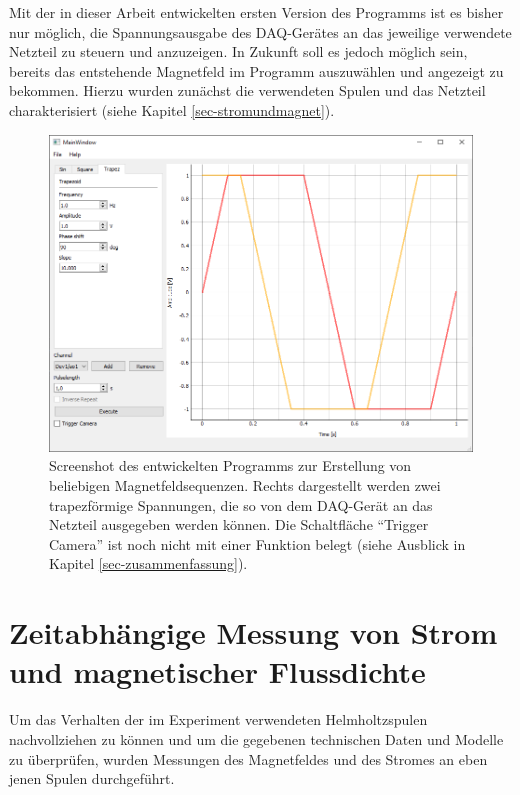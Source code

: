\documentclass[page,pdftex,12pt,a4paper,twoside,openright]{scrbook}
\begin{document}
Mit der in dieser Arbeit entwickelten ersten Version des Programms ist es bisher nur möglich, die Spannungsausgabe des DAQ-Gerätes an das jeweilige verwendete Netzteil zu steuern und anzuzeigen. In Zukunft soll es jedoch möglich sein, bereits das entstehende Magnetfeld im Programm auszuwählen und angezeigt zu bekommen. Hierzu wurden zunächst die verwendeten Spulen und das Netzteil charakterisiert (siehe Kapitel \ref{sec-stromundmagnet}).\\

\begin{figure}[H]
\centering
\includegraphics[width=\textwidth]{img/prog.png}
\caption{\label{fig-prog}
Screenshot des entwickelten Programms zur Erstellung von beliebigen Magnetfeldsequenzen. Rechts dargestellt werden zwei trapezförmige Spannungen, die so von dem DAQ-Gerät an das Netzteil ausgegeben werden können. Die Schaltfläche "`Trigger Camera"' ist noch nicht mit einer Funktion belegt (siehe Ausblick in Kapitel \ref{sec-zusammenfassung}).}
\end{figure}

\section{Zeitabhängige Messung von Strom und magnetischer Flussdichte \label{sec-stromundmagnet}}
\label{sec:orgaf3bc02}
Um das Verhalten der im Experiment verwendeten Helmholtzspulen nachvollziehen zu können und um die gegebenen technischen Daten und Modelle zu überprüfen, wurden Messungen des Magnetfeldes und des Stromes an eben jenen Spulen durchgeführt.\\
\end{document}
